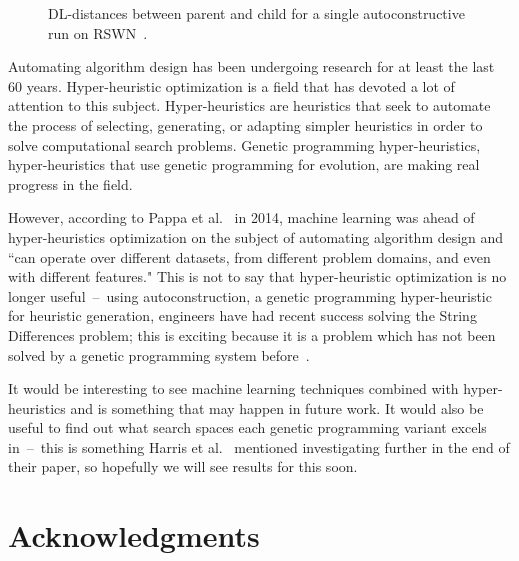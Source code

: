\documentclass{sig-alternate}
\begin{document}
\label{sec:results}
\begin{figure}
	\caption{DL-distances between parent and child for a single autoconstructive run on RSWN~\cite{spector:2016}.}
	\label{fig:ac}
\end{figure}

Automating algorithm design has been undergoing research for at least the last 60 years. Hyper-heuristic optimization is a field that has devoted a lot of attention to this subject. Hyper-heuristics are heuristics that seek to automate the process of selecting, generating, or adapting simpler heuristics in order to solve computational search problems. Genetic programming hyper-heuristics, hyper-heuristics that use genetic programming for evolution, are making real progress in the field.

However, according to Pappa et al.~\cite{pappa:2014} in 2014, machine learning was ahead of hyper-heuristics optimization on the subject of automating algorithm design and ``can operate over different datasets, from different problem domains, and even with different features." This is not to say that hyper-heuristic optimization is no longer useful~--~using autoconstruction, a genetic programming hyper-heuristic for heuristic generation, engineers have had recent success solving the String Differences problem; this is exciting because it is a problem which has not been solved by a genetic programming system before~\cite{eva:2017}.

It would be interesting to see machine learning techniques combined with hyper-heuristics and is something that may happen in future work. It would also be useful to find out what search spaces each genetic programming variant excels in~--~this is something Harris et al.~\cite{harris:2015} mentioned investigating further in the end of their paper, so hopefully we will see results for this soon.

\section*{Acknowledgments}
\label{sec:acknowledgments}



  
\end{document}
